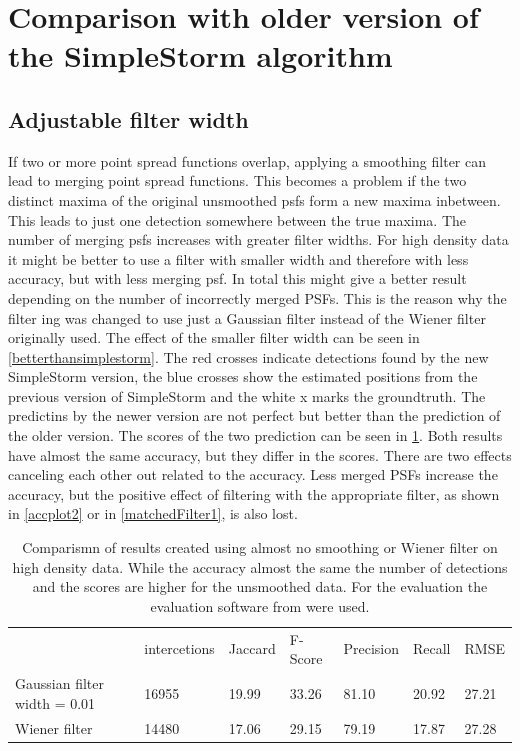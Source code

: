 \section{Comparison with older version of the SimpleStorm algorithm}
\subsection{Adjustable filter width} \label{sectionFilterisEvil}
If two or more point spread functions overlap, applying a smoothing filter can lead to merging point spread functions. This becomes a problem if the two distinct maxima of the original unsmoothed psfs form a new maxima inbetween. This leads to just one detection somewhere between the true maxima. The number of merging psfs increases with greater filter widths. For high density data it might be better to use a filter with smaller width and therefore with less accuracy, but with less merging psf. In total this might give a better result depending on the number of incorrectly merged PSFs. This is the reason why the filter ing was changed to use just a Gaussian filter instead of the Wiener filter originally used. 
The effect of the smaller filter width can be seen in \ref{betterthansimplestorm}. The red crosses indicate detections found by the new SimpleStorm version, the blue crosses show the estimated positions from the previous version of SimpleStorm and the white x marks the groundtruth. The predictins by the newer version are not perfect but better than the prediction of the older version. The scores of the two prediction can be seen in \ref{tabelbetterthansimplestorm}. Both results have almost the same accuracy, but they differ in the scores. There are two effects canceling each other out related to the accuracy. Less merged PSFs increase the accuracy, but the positive effect of filtering with the appropriate filter, as shown in \ref{accplot2} or in \ref{matchedFilter1}, is also lost. 

\begin{table}
\caption{Comparismn of results created using almost no smoothing or Wiener filter on high density data. While the accuracy almost the same the number of detections and the scores are higher for the unsmoothed data. For the evaluation the evaluation software from \cite{challenge} were used.}
\begin{tabular}{lllllll}
&intercetions&Jaccard&F-Score&Precision&Recall&RMSE\\
Gaussian filter width = 0.01& 16955&19.99&33.26&81.10&20.92&27.21\\
Wiener filter& 14480&17.06&29.15&79.19&17.87&27.28
\end{tabular} \label{tabelbetterthansimplestorm}

\end{table}





